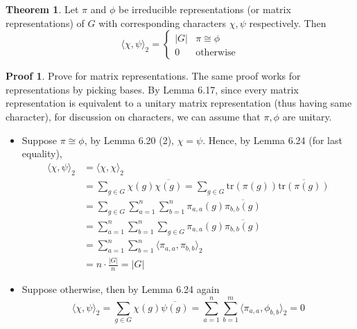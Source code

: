\documentclass{book}
\newcommand{\inner}[1]{\langle #1 \rangle}
\newcommand{\abs}[1]{\lvert #1 \rvert }
\newcommand{\tr}[1]{\textrm{tr}( #1 )}
\theoremstyle{definition}
\newtheorem{theorem}[lemma]{Theorem}
\theoremstyle{remarkstyle}
\newtheorem*{myproof}{Proof}%
\begin{document}
\begin{theorem}
    Let $\pi$ and $\phi$ be irreducible representations (or matrix representations) of $G$ with corresponding characters $\chi,\psi$ respectively. Then 
    $$
    \inner{\chi,\psi}_2 = \left\{
    \begin{array}{ll}
        \abs{G} & \pi\cong\phi  \\
         0 & \textrm{otherwise} 
    \end{array}
    \right.
    $$
\end{theorem}
\begin{myproof}
    Prove for matrix representations. The same proof works for representations by picking bases. By Lemma 6.17, since every matrix representation is equivalent to a unitary matrix representation (thus having same character), for discussion on characters, we can assume that $\pi,\phi$ are unitary.
    \begin{itemize}
        \item Suppose $\pi\cong\phi$, by Lemma 6.20 (2), $\chi=\psi$. Hence, by Lemma 6.24 (for last equality),
        \begin{align*}
            \inner{\chi,\psi}_2 
            &= \inner{\chi,\chi}_2 \\
            &= \sum_{g\in G}\chi(g)\overline{\chi(g)} = \sum_{g\in G}\tr{\pi(g)}\overline{\tr{\pi(g)}} \\
            &= \sum_{g\in G}\sum_{a=1}^{n}\sum_{b=1}^{n}\pi_{a,a}(g)\overline{\pi_{b,b}(g)} \\
            &= \sum_{a=1}^{n}\sum_{b=1}^{n}\sum_{g\in G}\pi_{a,a}(g)\overline{\pi_{b,b}(g)} \\
            &= \sum_{a=1}^{n}\sum_{b=1}^{n}\inner{\pi_{a,a},\pi_{b,b}}_2 \\
            &= n \cdot \frac{\abs{G}}{n} = \abs{G}
        \end{align*}
        \item Suppose otherwise, then by Lemma 6.24 again 
        $$
        \inner{\chi,\psi}_2 = \sum_{g\in G}\chi(g)\overline{\psi(g)} = \sum_{a=1}^{n}\sum_{b=1}^{m}\inner{\pi_{a,a},\phi_{b,b}}_2 = 0
        $$
        \newline
    \end{itemize}
\end{myproof}
\end{document}
